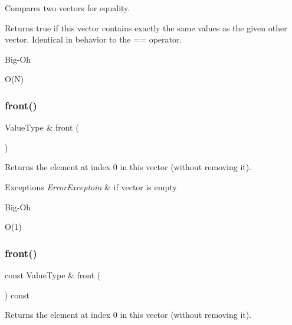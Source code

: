 Compares two vectors for equality. 

Returns {\ttfamily true} if this vector contains exactly the same values as the given other vector. Identical in behavior to the == operator. \begin{DoxyRefDesc}{Big-\/\+Oh}
\item[\mbox{\hyperlink{BigOh__BigOh000110}{Big-\/\+Oh}}]O(\+N) \end{DoxyRefDesc}
\mbox{\label{classVector_a736a6bda35a26620407e175bee46ae4a}} 
\subsubsection{\texorpdfstring{front()}{front()}\hspace{0.1cm}{\footnotesize\ttfamily [1/2]}}
{\footnotesize\ttfamily Value\+Type \& front (\begin{DoxyParamCaption}{ }\end{DoxyParamCaption})}



Returns the element at index 0 in this vector (without removing it). 


\begin{DoxyExceptions}{Exceptions}
{\em Error\+Exceptoin} & if vector is empty \\
\hline
\end{DoxyExceptions}
\begin{DoxyRefDesc}{Big-\/\+Oh}
\item[\mbox{\hyperlink{BigOh__BigOh000111}{Big-\/\+Oh}}]O(1) \end{DoxyRefDesc}
\mbox{\label{classVector_a02aaa52ad7a120201f6dd3e90eff737f}} 
\subsubsection{\texorpdfstring{front()}{front()}\hspace{0.1cm}{\footnotesize\ttfamily [2/2]}}
{\footnotesize\ttfamily const Value\+Type \& front (\begin{DoxyParamCaption}{ }\end{DoxyParamCaption}) const}



Returns the element at index 0 in this vector (without removing it). 


